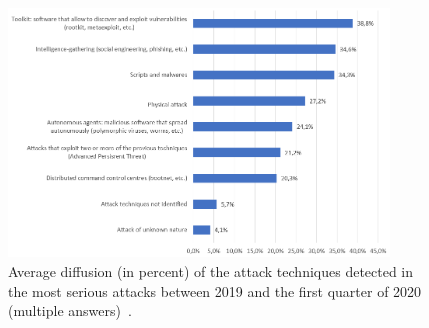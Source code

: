 \documentclass{easychair}
\begin{document}
\begin{figure}
  \centering
  \includegraphics[width=0.90\textwidth]{pictures/fig6.png}
  \caption{Average diffusion (in percent) of the attack techniques detected in the most serious attacks between 2019 and the first quarter of 2020 (multiple answers)~\cite{oad20}.}
  \label{fig:6}
\end{figure}
\end{document}
